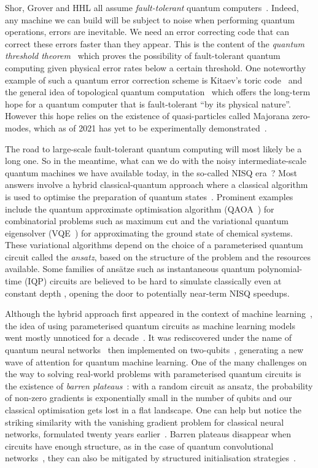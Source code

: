 Shor, Grover and HHL all assume \emph{fault-tolerant}
quantum computers~\cite{Shor96}.
Indeed, any machine we can build will be subject to noise when performing
quantum operations, errors are inevitable.
We need an error correcting code
that can correct these errors faster than they appear.
This is the content of the \emph{quantum threshold theorem}~\cite{AharonovBen-Or08}
which proves the possibility of fault-tolerant quantum computing
given physical error rates below a certain threshold.
One noteworthy example of such a quantum error correction scheme is Kitaev's
toric code~\cite{Kitaev03} and the general idea of topological quantum
computation~\cite{FreedmanEtAl03} which offers the long-term hope for a
quantum computer that is fault-tolerant ``by its physical nature''.
However this hope relies on the existence of quasi-particles called Majorana
zero-modes, which as of 2021 has yet to be experimentally demonstrated~\cite{Ball21}.

The road to large-scale fault-tolerant quantum computing will most likely be a long one.
So in the meantime, what can we do with the noisy intermediate-scale quantum machines we have available today, in the so-called NISQ era~\cite{Preskill18}?
Most answers involve a hybrid classical-quantum approach where a classical algorithm is used to optimise the preparation of quantum states~\cite{McCleanEtAl16}.
Prominent examples include the quantum approximate optimisation algorithm (QAOA~\cite{FarhiEtAl14}) for combinatorial problems such as maximum cut and the variational quantum eigensolver (VQE~\cite{PeruzzoEtAl14}) for approximating the ground state of chemical systems.
These variational algorithms depend on the choice of a parameterised quantum circuit called the \emph{ansatz}, based on the structure of the problem and the resources available.
Some families of ansätze such as instantaneous quantum polynomial-time (IQP) circuits are believed to be hard to simulate classically even at constant depth \cite{ShepherdBremner09}, opening the door to potentially near-term NISQ speedups.

Although the hybrid approach first appeared in the context of machine learning~\cite{BangEtAl08}, the idea of using parameterised quantum circuits as machine learning models went mostly unnoticed for a decade~\cite{BenedettiEtAl19}.
It was rediscovered under the name of quantum neural networks~\cite{FarhiNeven18} then implemented on two-qubits~\cite{HavlicekEtAl19}, generating a new wave of attention for quantum machine learning.
One of the many challenges on the way to solving real-world problems with parameterised quantum circuits is the existence of \emph{barren plateaus}~\cite{McCleanEtAl18}:
with a random circuit as ansatz, the probability of non-zero gradients is exponentially small in the number of qubits and our classical optimisation gets lost in a flat landscape.
One can help but notice the striking similarity with the vanishing gradient
problem for classical neural networks, formulated twenty years earlier~\cite{Hochreiter98}.
Barren plateaus disappear when circuits have enough structure, as in the case of quantum convolutional networks~\cite{PesahEtAl21}, they can also be mitigated by structured initialisation strategies~\cite{GrantEtAl19}.

